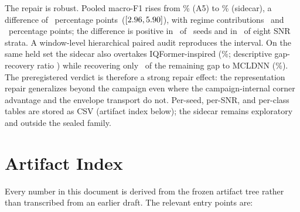 \documentclass[letterpaper,onecolumn,11pt,journal]{IEEEtran}
\newcommand{\pp}{percentage points}
\begin{document}
The repair is robust. Pooled macro-F1 rises from \SevereRepairLevelAFive\%
(A5) to \SevereRepairLevelSidecar\% (sidecar), a difference of
\SevereRepairDiff\ \pp\ ($[2.96,5.90]$), with
regime contributions \SevereRepairRegimeOneDiff\ and
\SevereRepairRegimeTwoDiff\ \pp; the difference is positive in
\SevereRepairPositiveSeeds\ of \ProtocolSeedCount\ seeds and in
\SevereRepairPositiveSnrStrata\ of eight SNR strata. A window-level
hierarchical paired audit reproduces the interval. On the same held set the
sidecar also overtakes IQFormer-inspired (\SevereRepairLevelIqformer\%;
descriptive gap-recovery ratio \SevereRepairGapRecoveryIqformer) while
recovering only \SevereRepairGapRecoveryMcldnn\ of the remaining gap to
MCLDNN (\SevereRepairLevelMcldnn\%). The preregistered verdict is therefore
a strong repair effect: the representation repair generalizes beyond the
campaign even where the campaign-internal corner advantage and the envelope
transport do not. Per-seed, per-SNR, and per-class tables are stored as CSV
(artifact index below); the sidecar remains exploratory and outside the
sealed family.

\section{Artifact Index}
Every number in this document is derived from the frozen artifact tree rather
than transcribed from an earlier draft. The relevant entry points are:
\end{document}
